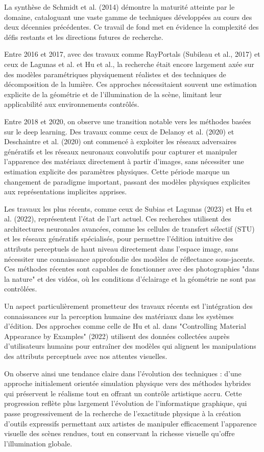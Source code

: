 \documentclass{article}
\begin{document}
La synthèse de Schmidt et al. (2014) démontre la maturité atteinte par le domaine, cataloguant une vaste gamme de techniques développées au cours des deux décennies précédentes. Ce travail de fond met en évidence la complexité des défis restants et les directions futures de recherche.

Entre 2016 et 2017, avec des travaux comme RayPortals (Subileau et al., 2017) et ceux de Lagunas et al. et Hu et al., la recherche était encore largement axée sur des modèles paramétriques physiquement réalistes et des techniques de décomposition de la lumière. Ces approches nécessitaient souvent une estimation explicite de la géométrie et de l'illumination de la scène, limitant leur applicabilité aux environnements contrôlés.

Entre 2018 et 2020, on observe une transition notable vers les méthodes basées sur le deep learning. Des travaux comme ceux de Delanoy et al. (2020) et Deschaintre et al. (2020) ont commencé à exploiter les réseaux adversaires génératifs et les réseaux neuronaux convolutifs pour capturer et manipuler l'apparence des matériaux directement à partir d'images, sans nécessiter une estimation explicite des paramètres physiques. Cette période marque un changement de paradigme important, passant des modèles physiques explicites aux représentations implicites apprises.

Les travaux les plus récents, comme ceux de Subias et Lagunas (2023) et Hu et al. (2022), représentent l'état de l'art actuel. Ces recherches utilisent des architectures neuronales avancées, comme les cellules de transfert sélectif (STU) et les réseaux génératifs spécialisés, pour permettre l'édition intuitive des attributs perceptuels de haut niveau directement dans l'espace image, sans nécessiter une connaissance approfondie des modèles de réflectance sous-jacents. Ces méthodes récentes sont capables de fonctionner avec des photographies "dans la nature" et des vidéos, où les conditions d'éclairage et la géométrie ne sont pas contrôlées.

Un aspect particulièrement prometteur des travaux récents est l'intégration des connaissances sur la perception humaine des matériaux dans les systèmes d'édition. Des approches comme celle de Hu et al. dans "Controlling Material Appearance by Examples" (2022) utilisent des données collectées auprès d'utilisateurs humains pour entraîner des modèles qui alignent les manipulations des attributs perceptuels avec nos attentes visuelles.

On observe ainsi une tendance claire dans l'évolution des techniques : d'une approche initialement orientée simulation physique vers des méthodes hybrides qui préservent le réalisme tout en offrant un contrôle artistique accru. Cette progression reflète plus largement l'évolution de l'informatique graphique, qui passe progressivement de la recherche de l'exactitude physique à la création d'outils expressifs permettant aux artistes de manipuler efficacement l'apparence visuelle des scènes rendues, tout en conservant la richesse visuelle qu'offre l'illumination globale.
\end{document}
